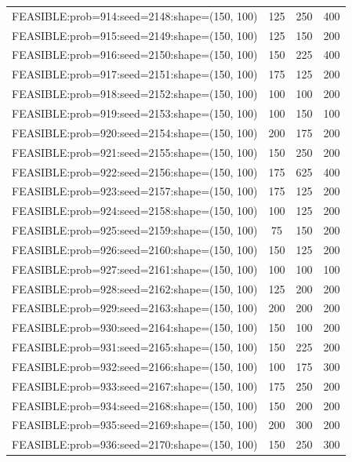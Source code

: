 \begin{longtable}{lccc}
FEASIBLE:prob=914:seed=2148:shape=(150, 100) &      125 &   250 &    400 \\
FEASIBLE:prob=915:seed=2149:shape=(150, 100) &      125 &   150 &    200 \\
FEASIBLE:prob=916:seed=2150:shape=(150, 100) &      150 &   225 &    400 \\
FEASIBLE:prob=917:seed=2151:shape=(150, 100) &      175 &   125 &    200 \\
FEASIBLE:prob=918:seed=2152:shape=(150, 100) &      100 &   100 &    200 \\
FEASIBLE:prob=919:seed=2153:shape=(150, 100) &      100 &   150 &    100 \\
FEASIBLE:prob=920:seed=2154:shape=(150, 100) &      200 &   175 &    200 \\
FEASIBLE:prob=921:seed=2155:shape=(150, 100) &      150 &   250 &    200 \\
FEASIBLE:prob=922:seed=2156:shape=(150, 100) &      175 &   625 &    400 \\
FEASIBLE:prob=923:seed=2157:shape=(150, 100) &      175 &   125 &    200 \\
FEASIBLE:prob=924:seed=2158:shape=(150, 100) &      100 &   125 &    200 \\
FEASIBLE:prob=925:seed=2159:shape=(150, 100) &       75 &   150 &    200 \\
FEASIBLE:prob=926:seed=2160:shape=(150, 100) &      150 &   125 &    200 \\
FEASIBLE:prob=927:seed=2161:shape=(150, 100) &      100 &   100 &    100 \\
FEASIBLE:prob=928:seed=2162:shape=(150, 100) &      125 &   200 &    200 \\
FEASIBLE:prob=929:seed=2163:shape=(150, 100) &      200 &   200 &    200 \\
FEASIBLE:prob=930:seed=2164:shape=(150, 100) &      150 &   100 &    200 \\
FEASIBLE:prob=931:seed=2165:shape=(150, 100) &      150 &   225 &    200 \\
FEASIBLE:prob=932:seed=2166:shape=(150, 100) &      100 &   175 &    300 \\
FEASIBLE:prob=933:seed=2167:shape=(150, 100) &      175 &   250 &    200 \\
FEASIBLE:prob=934:seed=2168:shape=(150, 100) &      150 &   200 &    200 \\
FEASIBLE:prob=935:seed=2169:shape=(150, 100) &      200 &   300 &    200 \\
FEASIBLE:prob=936:seed=2170:shape=(150, 100) &      150 &   250 &    300 \\

\end{longtable}
